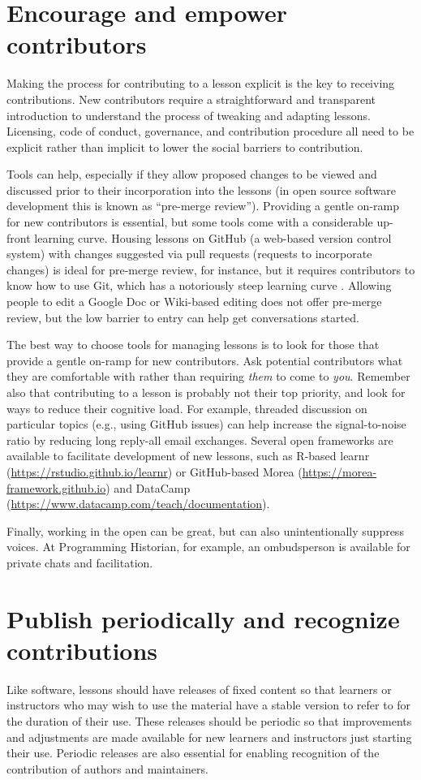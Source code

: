 \documentclass[10pt,letterpaper]{article}
\newcommand{\rulemajor}[1]{\section{#1}}
\begin{document}
\rulemajor{Encourage and empower contributors}

Making the process for contributing to a lesson explicit is
the key to receiving contributions.
New contributors require a straightforward and transparent introduction
to understand the process of tweaking and adapting lessons.
Licensing, code of conduct, governance, and contribution procedure
all need to be explicit rather than implicit
to lower the social barriers to contribution.

Tools can help,
especially if they allow proposed changes to be viewed and discussed
prior to their incorporation into the lessons
(in open source software development this is known as ``pre-merge review'').
Providing a gentle on-ramp for new contributors is essential,
but some tools come with a considerable up-front learning curve.
Housing lessons on GitHub (a web-based version control system)
with changes suggested via pull requests (requests to incorporate changes) is
ideal for pre-merge review, for instance,
but it requires contributors to know how to use Git,
which has a notoriously steep learning curve \cite{git-survey}.
Allowing people to edit a Google Doc or Wiki-based editing does not offer pre-merge review,
but the low barrier to entry can help get conversations started.

The best way to choose tools for managing lessons
is to look for those that provide a gentle on-ramp for new contributors.
Ask potential contributors what they are comfortable with
rather than requiring \emph{them} to come to \emph{you}.
Remember also that contributing to a lesson is probably not their top priority,
and look for ways to reduce their cognitive load.
For example,
threaded discussion on particular topics (e.g., using GitHub issues)
can help increase the signal-to-noise ratio
by reducing long reply-all email exchanges.
Several open frameworks are available to facilitate
development of new lessons, such as R-based
learnr (\url{https://rstudio.github.io/learnr}) or
GitHub-based Morea (\url{https://morea-framework.github.io}) and
DataCamp (\url{https://www.datacamp.com/teach/documentation}).

Finally,
working in the open can be great,
but can also unintentionally suppress voices.
At Programming Historian,
for example,
an ombudsperson is available for private chats and facilitation.

\rulemajor{Publish periodically and recognize contributions}

Like software,
lessons should have releases of fixed content
so that learners or instructors who may wish to use the material have a stable version to refer to
for the duration of their use.
These releases should be periodic
so that improvements and adjustments are made available
for new learners and instructors just starting their use.
Periodic releases are also essential
for enabling recognition of the contribution of authors and maintainers.
\end{document}
